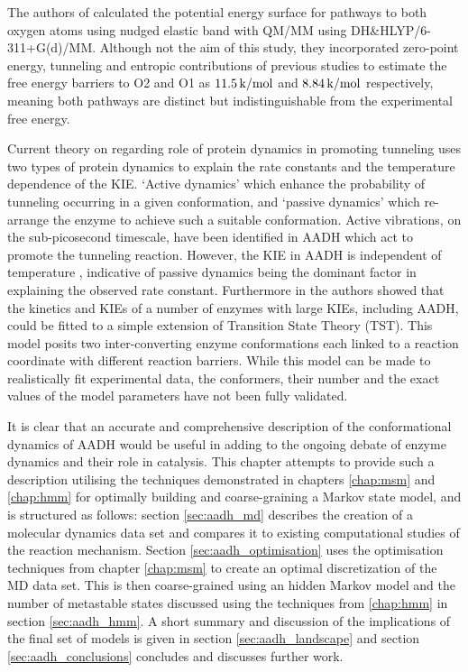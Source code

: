 The authors of \cite{ranaghanInitioQMMM2017} calculated the potential energy surface for pathways to both oxygen atoms using nudged elastic band with QM/MM using DH\&HLYP/6-311+G(d)/MM. Although not the aim of this study, they incorporated zero-point energy, tunneling and entropic contributions of previous studies \cite{masgrauAtomicDescriptionEnzyme2006}\cite{masgrauTunnelingClassicalPaths2007} to estimate the free energy barriers to O2 and O1 as $\SI{11.5}{\kilo\cal\per\mol}$ and $\SI{8.84}{\kilo\cal\per\mol}$ respectively, meaning both pathways are distinct but indistinguishable from the experimental free energy.  

Current theory on regarding role of protein dynamics in promoting tunneling  \cite{kuznetsovProtonHydrogenAtom1999a}\cite{masgrau2004hydrogen} uses two types of protein dynamics to explain the rate constants and the temperature dependence of the KIE. `Active dynamics' which enhance the probability of tunneling occurring in a given conformation, and `passive dynamics' which re-arrange the enzyme to achieve such a suitable conformation. Active vibrations, on the sub-picosecond timescale,  have been identified in AADH \cite{johannissenEnzymeAromaticAmine2008}\cite{johannissenProtonTunnelingAromatic2007} which act to promote the tunneling reaction.  However, the KIE in AADH is independent of temperature \cite{masgrauAtomicDescriptionEnzyme2006}, indicative of passive dynamics being the dominant factor in explaining the observed rate constant. Furthermore in  \cite{glowackiProteinDynamicsEnzyme2012a}\cite{glowackiTakingOckhamRazor2012b} the authors showed that the kinetics and KIEs of a number of enzymes with large KIEs, including AADH, could be fitted to a simple extension of Transition State Theory (TST). This model posits two inter-converting enzyme conformations each linked to a reaction coordinate with different reaction barriers. While this model can be made to  realistically fit experimental data, the conformers, their number and the exact values of the model parameters have not been fully validated. 

It is clear that an accurate and comprehensive description of the conformational dynamics of AADH would be useful in adding to the ongoing debate of enzyme dynamics and their role in catalysis. This chapter attempts to provide such a description utilising the techniques demonstrated in chapters \ref{chap:msm} and \ref{chap:hmm} for optimally building and coarse-graining a Markov state model, and is structured as follows: section \ref{sec:aadh_md} describes the creation of a molecular dynamics data set and compares it to existing computational studies of the reaction mechanism. Section \ref{sec:aadh_optimisation} uses the optimisation techniques from chapter \ref{chap:msm} to create an optimal discretization of the MD data set. This is then coarse-grained using an hidden Markov model and the number of metastable states discussed using the techniques from \ref{chap:hmm} in section \ref{sec:aadh_hmm}. A short summary and discussion of the implications of the final set of models is given in section \ref{sec:aadh_landscape} and section \ref{sec:aadh_conclusions} concludes and discusses further work. 


